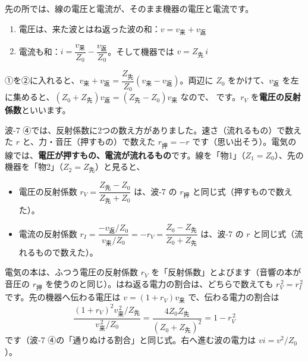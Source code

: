 先の所では、線の電圧と電流が、そのまま機器の電圧と電流です。
\begin{enumerate}[label={\bkcircled{\arabic*}}, leftmargin=2.4\zw, itemsep=2pt, topsep=2pt]
\item 電圧は、来た波とはね返った波の和：$v=v_{\text{来}}+v_{\text{返}}$
\item 電流も和：$i=\dfrac{v_{\text{来}}}{Z_0}-\dfrac{v_{\text{返}}}{Z_0}$。そして機器では $v=Z_{\text{先}}\,i$
\end{enumerate}
①を②に入れると、$v_{\text{来}}+v_{\text{返}}=\dfrac{Z_{\text{先}}}{Z_0}(v_{\text{来}}-v_{\text{返}})$。両辺に $Z_0$ をかけて、$v_{\text{返}}$ を左に集めると、$(Z_0+Z_{\text{先}})v_{\text{返}}=(Z_{\text{先}}-Z_0)v_{\text{来}}$ なので、
\label{ph:電-13:rV}です。$r_V$ を\textbf{電圧の反射係数}といいます。

波-7 ④では、反射係数に2つの数え方がありました。速さ（流れるもの）で数えた $r$ と、力・音圧（押すもの）で数えた $r_{\text{押}}=-r$ です（思い出そう）。電気の線では、\textbf{電圧が押すもの、電流が流れるもの}です。線を「物1」（$Z_1=Z_0$）、先の機器を「物2」（$Z_2=Z_{\text{先}}$）と見ると、
\begin{itemize}[leftmargin=1.2\zw, itemsep=1pt, topsep=1pt, label={\color{bkTheme}●}]
\item 電圧の反射係数 $r_V=\dfrac{Z_{\text{先}}-Z_0}{Z_{\text{先}}+Z_0}$ は、波-7 の $r_{\text{押}}$ と同じ式（押すもので数えた）。
\item 電流の反射係数 $r_I=\dfrac{-v_{\text{返}}/Z_0}{v_{\text{来}}/Z_0}=-r_V=\dfrac{Z_0-Z_{\text{先}}}{Z_0+Z_{\text{先}}}$ は、波-7 の $r$ と同じ式（流れるもので数えた）。
\end{itemize}
電気の本は、ふつう電圧の反射係数 $r_V$ を「反射係数」とよびます（音響の本が音圧の $r_{\text{押}}$ を使うのと同じ）。はね返る電力の割合は、どちらで数えても $r_V^{\,2}=r_I^{\,2}$ です。先の機器へ伝わる電圧は $v=(1+r_V)v_{\text{来}}$ で、伝わる電力の割合は
\[\frac{(1+r_V)^2v_{\text{来}}^{\,2}/Z_{\text{先}}}{v_{\text{来}}^{\,2}/Z_0}=\frac{4Z_0Z_{\text{先}}}{(Z_0+Z_{\text{先}})^2}=1-r_V^{\,2}\]
です（波-7 ④の「通りぬける割合」と同じ式。右へ進む波の電力は $vi=v^2/Z_0$）。

